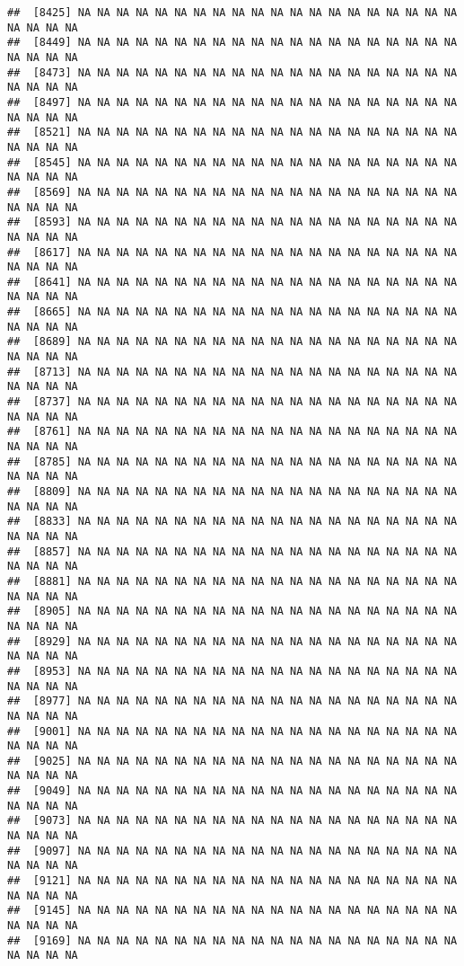 \documentclass[
]{article}
\begin{document}
\begin{verbatim}
##  [8425] NA NA NA NA NA NA NA NA NA NA NA NA NA NA NA NA NA NA NA NA NA NA NA NA
##  [8449] NA NA NA NA NA NA NA NA NA NA NA NA NA NA NA NA NA NA NA NA NA NA NA NA
##  [8473] NA NA NA NA NA NA NA NA NA NA NA NA NA NA NA NA NA NA NA NA NA NA NA NA
##  [8497] NA NA NA NA NA NA NA NA NA NA NA NA NA NA NA NA NA NA NA NA NA NA NA NA
##  [8521] NA NA NA NA NA NA NA NA NA NA NA NA NA NA NA NA NA NA NA NA NA NA NA NA
##  [8545] NA NA NA NA NA NA NA NA NA NA NA NA NA NA NA NA NA NA NA NA NA NA NA NA
##  [8569] NA NA NA NA NA NA NA NA NA NA NA NA NA NA NA NA NA NA NA NA NA NA NA NA
##  [8593] NA NA NA NA NA NA NA NA NA NA NA NA NA NA NA NA NA NA NA NA NA NA NA NA
##  [8617] NA NA NA NA NA NA NA NA NA NA NA NA NA NA NA NA NA NA NA NA NA NA NA NA
##  [8641] NA NA NA NA NA NA NA NA NA NA NA NA NA NA NA NA NA NA NA NA NA NA NA NA
##  [8665] NA NA NA NA NA NA NA NA NA NA NA NA NA NA NA NA NA NA NA NA NA NA NA NA
##  [8689] NA NA NA NA NA NA NA NA NA NA NA NA NA NA NA NA NA NA NA NA NA NA NA NA
##  [8713] NA NA NA NA NA NA NA NA NA NA NA NA NA NA NA NA NA NA NA NA NA NA NA NA
##  [8737] NA NA NA NA NA NA NA NA NA NA NA NA NA NA NA NA NA NA NA NA NA NA NA NA
##  [8761] NA NA NA NA NA NA NA NA NA NA NA NA NA NA NA NA NA NA NA NA NA NA NA NA
##  [8785] NA NA NA NA NA NA NA NA NA NA NA NA NA NA NA NA NA NA NA NA NA NA NA NA
##  [8809] NA NA NA NA NA NA NA NA NA NA NA NA NA NA NA NA NA NA NA NA NA NA NA NA
##  [8833] NA NA NA NA NA NA NA NA NA NA NA NA NA NA NA NA NA NA NA NA NA NA NA NA
##  [8857] NA NA NA NA NA NA NA NA NA NA NA NA NA NA NA NA NA NA NA NA NA NA NA NA
##  [8881] NA NA NA NA NA NA NA NA NA NA NA NA NA NA NA NA NA NA NA NA NA NA NA NA
##  [8905] NA NA NA NA NA NA NA NA NA NA NA NA NA NA NA NA NA NA NA NA NA NA NA NA
##  [8929] NA NA NA NA NA NA NA NA NA NA NA NA NA NA NA NA NA NA NA NA NA NA NA NA
##  [8953] NA NA NA NA NA NA NA NA NA NA NA NA NA NA NA NA NA NA NA NA NA NA NA NA
##  [8977] NA NA NA NA NA NA NA NA NA NA NA NA NA NA NA NA NA NA NA NA NA NA NA NA
##  [9001] NA NA NA NA NA NA NA NA NA NA NA NA NA NA NA NA NA NA NA NA NA NA NA NA
##  [9025] NA NA NA NA NA NA NA NA NA NA NA NA NA NA NA NA NA NA NA NA NA NA NA NA
##  [9049] NA NA NA NA NA NA NA NA NA NA NA NA NA NA NA NA NA NA NA NA NA NA NA NA
##  [9073] NA NA NA NA NA NA NA NA NA NA NA NA NA NA NA NA NA NA NA NA NA NA NA NA
##  [9097] NA NA NA NA NA NA NA NA NA NA NA NA NA NA NA NA NA NA NA NA NA NA NA NA
##  [9121] NA NA NA NA NA NA NA NA NA NA NA NA NA NA NA NA NA NA NA NA NA NA NA NA
##  [9145] NA NA NA NA NA NA NA NA NA NA NA NA NA NA NA NA NA NA NA NA NA NA NA NA
##  [9169] NA NA NA NA NA NA NA NA NA NA NA NA NA NA NA NA NA NA NA NA NA NA NA NA

\end{verbatim}
\end{document}
